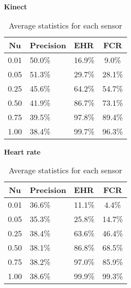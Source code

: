 \begin{table}[h]
  \textbf{Kinect}\vspace{2pt}
  \begin{tabularx}{\columnwidth}{cXXc}
    \toprule
    \textbf{Nu} & \textbf{Precision} & \textbf{EHR} & \textbf{FCR} \\
    \midrule
    0.01        & 50.0\%             & 16.9\%       & 9.0\%        \\ \hline
    0.05        & 51.3\%             & 29.7\%       & 28.1\%       \\ \hline
    0.25        & 45.6\%             & 64.2\%       & 54.7\%       \\ \hline
    0.50        & 41.9\%             & 86.7\%       & 73.1\%       \\ \hline
    0.75        & 39.5\%             & 97.8\%       & 89.4\%       \\ \hline
    1.00        & 38.4\%             & 99.7\%       & 96.3\%       \\ \hline
    \bottomrule
  \end{tabularx}

  \vspace{4pt}

  \textbf{Heart rate}\vspace{2pt}
  \begin{tabularx}{\columnwidth}{cXXc}
    \toprule
    \textbf{Nu} & \textbf{Precision} & \textbf{EHR} & \textbf{FCR} \\
    \midrule
    0.01        & 36.6\%             & 11.1\%       & 4.4\%        \\ \hline
    0.05        & 35.3\%             & 25.8\%       & 14.7\%       \\ \hline
    0.25        & 38.4\%             & 63.6\%       & 46.4\%       \\ \hline
    0.50        & 38.1\%             & 86.8\%       & 68.5\%       \\ \hline
    0.75        & 38.2\%             & 97.0\%       & 85.9\%       \\ \hline
    1.00        & 38.6\%             & 99.9\%       & 99.3\%       \\ \hline
   \bottomrule
  \end{tabularx}

  \caption{Average statistics for each sensor}
  \label{[TABLE]_avg_stats_sensors}
\end{table}